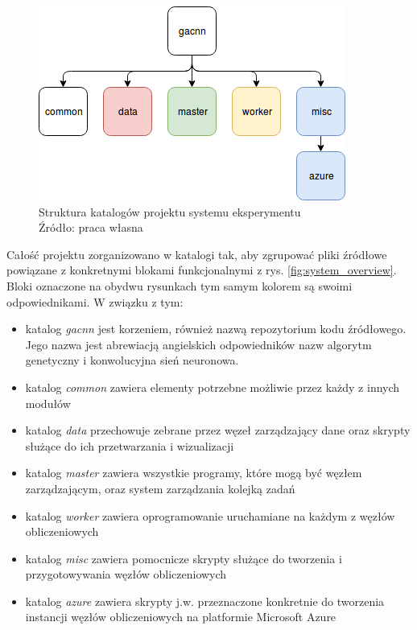 \begin{figure}[h!tb]
	 \centering
	 \includegraphics[width = 0.7\linewidth]{img/folder_structure}
	 \caption{Struktura katalogów projektu systemu eksperymentu\\
              Źródło: praca własna}
	 \label{fig:folder_structure}
\end{figure}

Całość projektu zorganizowano w katalogi tak, aby zgrupować pliki źródłowe powiązane z konkretnymi blokami funkcjonalnymi z rys. \ref{fig:system_overview}.
Bloki oznaczone na obydwu rysunkach tym samym kolorem są swoimi odpowiednikami.
W związku z tym:
\begin{itemize}
  \item katalog \textit{gacnn} jest korzeniem, również nazwą repozytorium kodu źródłowego.
        Jego nazwa jest abrewiacją angielskich odpowiedników nazw algorytm genetyczny i konwolucyjna sień neuronowa.
  \item katalog \textit{common} zawiera elementy potrzebne możliwie przez każdy z innych modułów
  \item katalog \textit{data} przechowuje zebrane przez węzeł zarządzający dane oraz skrypty służące do ich przetwarzania i wizualizacji
  \item katalog \textit{master} zawiera wszystkie programy, które mogą być węzłem zarządzającym, oraz system zarządzania kolejką zadań
  \item katalog \textit{worker} zawiera oprogramowanie uruchamiane na każdym z węzłów obliczeniowych
  \item katalog \textit{misc} zawiera pomocnicze skrypty służące do tworzenia i przygotowywania węzłów obliczeniowych
  \item katalog \textit{azure} zawiera skrypty j.w. przeznaczone konkretnie do tworzenia instancji węzłów obliczeniowych na platformie Microsoft Azure
\end{itemize}

